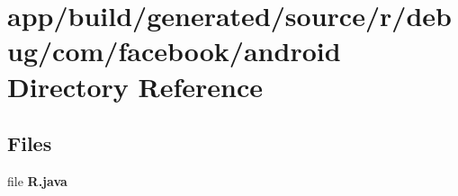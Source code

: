 \section{app/build/generated/source/r/debug/com/facebook/android Directory Reference}
\label{dir_612d273f4426e3da971019d84f4b8887}
\subsection*{Files}
\begin{DoxyCompactItemize}
\item 
file {\bfseries R.\+java}
\end{DoxyCompactItemize}
